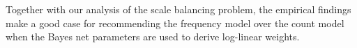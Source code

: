 \documentclass[twoside,leqno,twocolumn]{article}
\begin{document}







Together with our analysis of the scale balancing problem,
the empirical findings make a good case for recommending the frequency model over the count model when the Bayes net parameters are used to derive log-linear weights.



\end{document}
